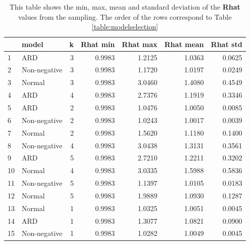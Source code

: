 \documentclass[12pt]{article}
\begin{document}
    \begin{table}[H]
        \centering
        \caption{This table shows the min, max, mean and standard deviation of the \textbf{Rhat} values from the sampling. The order of the rows correspond to Table \ref{table:modelselection}}
        \begin{tabular}{llr|rr|rr}
            \toprule
            {} &         model &  k &  Rhat min &  Rhat max &  Rhat mean &  Rhat std \\
            \midrule
            1  &           ARD &  3 &    0.9983 &    1.2125 &     1.0363 &    0.0625 \\
            2  &  Non-negative &  3 &    0.9983 &    1.1720 &     1.0197 &    0.0249 \\
            3  &        Normal &  3 &    0.9983 &    3.0460 &     1.4080 &    0.4549 \\
            4  &           ARD &  4 &    0.9983 &    2.7376 &     1.1919 &    0.3346 \\
            5  &           ARD &  2 &    0.9983 &    1.0476 &     1.0050 &    0.0085 \\
            6  &  Non-negative &  2 &    0.9983 &    1.0243 &     1.0017 &    0.0039 \\
            7  &        Normal &  2 &    0.9983 &    1.5620 &     1.1180 &    0.1400 \\
            8  &  Non-negative &  4 &    0.9983 &    3.0438 &     1.3131 &    0.3561 \\
            9  &           ARD &  5 &    0.9983 &    2.7210 &     1.2211 &    0.3202 \\
            10 &        Normal &  4 &    0.9983 &    3.0335 &     1.5988 &    0.5836 \\
            11 &  Non-negative &  5 &    0.9983 &    1.1397 &     1.0105 &    0.0183 \\
            12 &        Normal &  5 &    0.9983 &    1.9889 &     1.0930 &    0.1287 \\
            13 &        Normal &  1 &    0.9983 &    1.0325 &     1.0051 &    0.0045 \\
            14 &           ARD &  1 &    0.9983 &    1.3077 &     1.0821 &    0.0900 \\
            15 &  Non-negative &  1 &    0.9983 &    1.0282 &     1.0049 &    0.0045 \\
            \bottomrule
        \end{tabular}
    \end{table}
    
\end{document}
